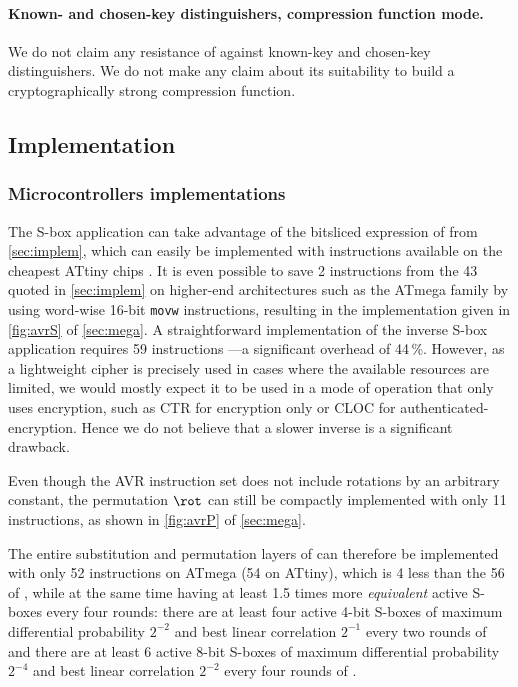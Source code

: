 \paragraph{Known- and chosen-key distinguishers, compression function mode.}
We do not claim any resistance of \fly against known-key and chosen-key distinguishers. We do not make any claim about its suitability
to build a cryptographically strong compression function.

\subsection{Implementation}
\label{sec:flyimplem}


\subsubsection{Microcontrollers implementations}
The S-box application can take advantage of the bitsliced expression of \littlunOne from \autoref{sec:implem}, which can easily be implemented with instructions available on the cheapest ATtiny chips \cite{ATtiny}. It is even possible to save 2 instructions from
the 43 quoted in \autoref{sec:implem} on higher-end architectures such as the ATmega family \cite{ATmega} by using word-wise 16-bit \texttt{movw} instructions,
resulting in the implementation given in \autoref{fig:avrS} of \autoref{sec:mega}. A straightforward implementation of the inverse S-box application requires 59 instructions ---a significant overhead of 44\,\%.
However, as a lightweight cipher is precisely used in cases where the available resources are limited, we would mostly expect it to be used in a mode of operation that only uses encryption,
such as \eg \textsf{CTR} for encryption only or \textsf{CLOC} \cite{cloc} for authenticated-encryption. Hence we do not believe that a slower inverse is a significant drawback.

Even though the AVR instruction set does not include rotations by an arbitrary constant, the permutation $\rot$ can still
be compactly implemented with only 11 instructions, as shown in \autoref{fig:avrP} of \autoref{sec:mega}.

The entire substitution and permutation layers of \fly can therefore be implemented with only 52 instructions on ATmega (54 on ATtiny), which is 4 less than the 56 of \pride \cite{pride},
while at the same time having at least 1.5 times more \emph{equivalent} active S-boxes every four rounds: there are at least four active 4-bit S-boxes of maximum differential probability $2^{-2}$ and
best linear correlation $2^{-1}$ every two rounds of \pride and there are at least 6 active 8-bit S-boxes of maximum differential probability $2^{-4}$ and best linear correlation $2^{-2}$ every
four rounds of \fly.

